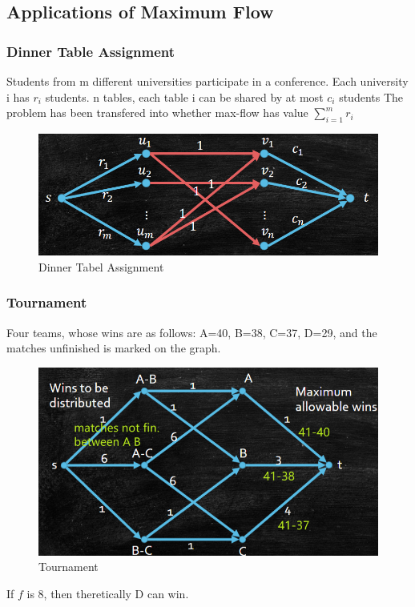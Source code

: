 \subsection{Applications of Maximum Flow}
\subsubsection{Dinner Table Assignment}
Students from m different universities participate in a
conference. Each university i has $r_i$ students.
n tables, each table i can be shared by at most $c_i$ students
The problem has been transfered into whether max-flow has value $\sum_{i=1}^mr_i$
\begin{figure}
    \centering
    \includegraphics[width=0.5\linewidth]{Notes/fig/DTA.png}
    \caption{Dinner Tabel Assignment}
    \label{fig:DTA}
\end{figure}

\subsubsection{Tournament}
Four teams, whose wins are as follows: A=40, B=38, C=37, D=29, and the matches unfinished is marked on the graph.
\begin{figure}
    \centering
    \includegraphics[width=0.5\linewidth]{Notes/fig/tournament.png}
    \caption{Tournament}
    \label{fig:tnm}
\end{figure}
If $f$ is 8, then theretically D can win.
